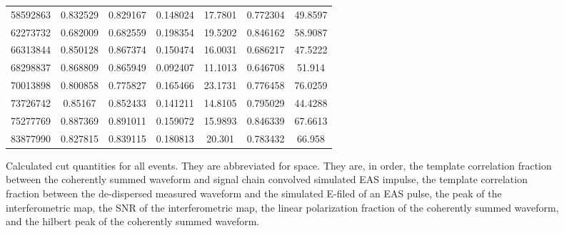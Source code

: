 \begin{figure}
\begin{tabular}{|c|c|c|c|c|c|c|}
	58592863	&	0.832529	&	0.829167	&	0.148024	&	17.7801	&	0.772304	&	49.8597 \\
	62273732	&	0.682009	&	0.682559	&	0.198354	&	19.5202	&	0.846162	&	58.9087 \\
	66313844	&	0.850128	&	0.867374	&	0.150474	&	16.0031	&	0.686217	&	47.5222 \\
	68298837	&	0.868809	&	0.865949	&	0.092407	&	11.1013	&	0.646708	&	51.914 \\
	70013898	&	0.800858	&	0.775827	&	0.165466	&	23.1731	&	0.776458	&	76.0259 \\
	73726742	&	0.85167	&	0.852433	&	0.141211	&	14.8105	&	0.795029	&	44.4288 \\
	75277769	&	0.887369	&	0.891011	&	0.159072	&	15.9893	&	0.846339	&	67.6613 \\
	83877990	&	0.827815	&	0.839115	&	0.180813	&	20.301	&	0.783432	&	66.958 \\
	\hline
	\end{tabular}
	\caption{Calculated cut quantities for all events. They are abbreviated for space.  They are, in order, the template correlation fraction between the coherently summed waveform and signal chain convolved simulated EAS impulse, the template correlation fraction between the de-dispersed measured waveform and the simulated E-filed of an EAS pulse, the peak of the interferometric map, the SNR of the interferometric map, the linear polarization fraction of the coherently summed waveform, and the hilbert peak of the coherently summed waveform. }
	\label{tab:candidateValues}
	\end{figure}

	
	
	
	
